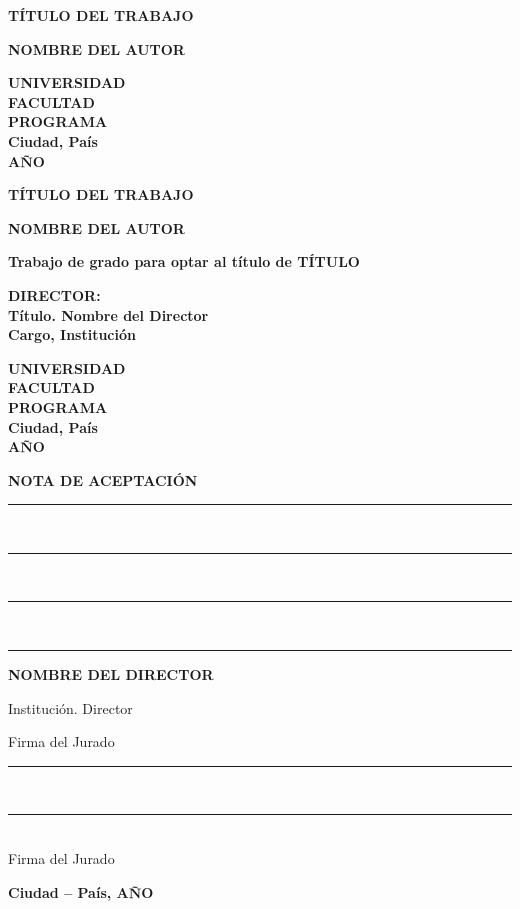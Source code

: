 \documentclass[10pt]{report}
\begin{document}
\begin{titlepage}
    \centering
    {\bfseries\large TÍTULO DEL TRABAJO \par}
    \vfill
    {\bfseries\large NOMBRE DEL AUTOR \par}
    \vfill
    {\bfseries\large UNIVERSIDAD \\
     FACULTAD \\
     PROGRAMA \\
     Ciudad, País \\
     AÑO \par}
\end{titlepage}

\begin{titlepage}
    \centering
    {\bfseries\large TÍTULO DEL TRABAJO \par}
    \vfill
    {\bfseries\large NOMBRE DEL AUTOR \par}
    \vfill
    {\bfseries\large Trabajo de grado para optar al título de TÍTULO}
    \vfill
    {\bfseries\large DIRECTOR: \\
    Título. Nombre del Director \\
    Cargo, Institución \par}
    \vfill
    {\bfseries\large UNIVERSIDAD \\
     FACULTAD \\
     PROGRAMA \\
     Ciudad, País \\
     AÑO \par}
\end{titlepage}

\newpage
\begin{titlepage}
\begin{flushright}
    {\bfseries NOTA DE ACEPTACIÓN \par}
    \vspace{0.5cm}
    \rule{8cm}{0.4pt} \\
    \vspace{0.2cm}
    \rule{8cm}{0.4pt} \\
    \vspace{0.2cm}
    \rule{8cm}{0.4pt} \\
    \vspace{0.2cm}
    \rule{8cm}{0.4pt}
\end{flushright}
\vfill
\begin{flushright}
    {\bfseries NOMBRE DEL DIRECTOR \par}
    Institución. Director
\end{flushright}
\vfill
\begin{flushright}
    Firma del Jurado
    \rule{8cm}{0.4pt} \\
    \vspace{2cm}
    \rule{8cm}{0.4pt} \\
    Firma del Jurado
\end{flushright}
\vfill
\begin{flushright}
    {\bfseries Ciudad – País, AÑO}
\end{flushright}
\end{titlepage}
\end{document}
